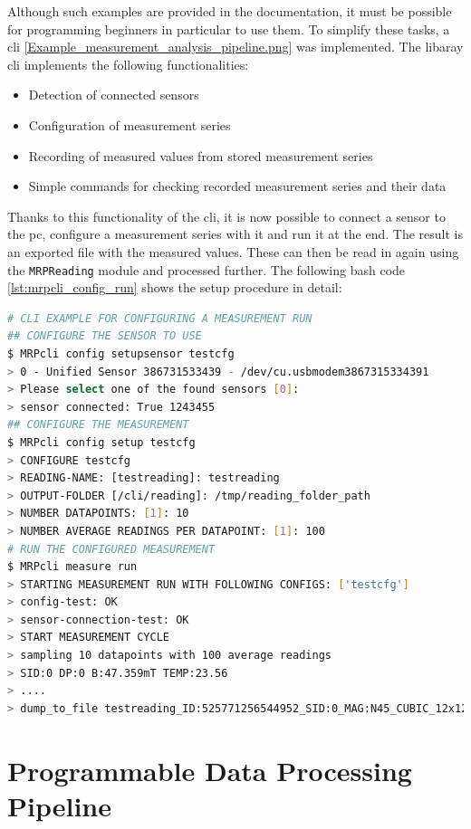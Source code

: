 Although such examples are provided in the documentation, it must be
possible for programming beginners in particular to use them. To
simplify these tasks, a \gls{cli}
\ref{Example_measurement_analysis_pipeline.png} was implemented. The
libaray \gls{cli} implements the following functionalities:

\begin{itemize}
\tightlist
\item
  Detection of connected sensors
\item
  Configuration of measurement series
\item
  Recording of measured values from stored measurement series
\item
  Simple commands for checking recorded measurement series and their
  data
\end{itemize}

Thanks to this functionality of the \gls{cli}, it is now possible to
connect a sensor to the \gls{pc}, configure a measurement series with it
and run it at the end. The result is an exported file with the measured
values. These can then be read in again using the
\passthrough{\lstinline!MRPReading!} module and processed further. The
following bash code \ref{lst:mrpcli_config_run} shows the setup
procedure in detail:

\begin{lstlisting}[language=bash, caption={CLI example for configuring a measurement run}, label=lst:mrpcli_config_run]
# CLI EXAMPLE FOR CONFIGURING A MEASUREMENT RUN
## CONFIGURE THE SENSOR TO USE
$ MRPcli config setupsensor testcfg
> 0 - Unified Sensor 386731533439 - /dev/cu.usbmodem3867315334391
> Please select one of the found sensors [0]:
> sensor connected: True 1243455
## CONFIGURE THE MEASUREMENT
$ MRPcli config setup testcfg
> CONFIGURE testcfg
> READING-NAME: [testreading]: testreading
> OUTPUT-FOLDER [/cli/reading]: /tmp/reading_folder_path
> NUMBER DATAPOINTS: [1]: 10
> NUMBER AVERAGE READINGS PER DATAPOINT: [1]: 100
# RUN THE CONFIGURED MEASUREMENT
$ MRPcli measure run
> STARTING MEASUREMENT RUN WITH FOLLOWING CONFIGS: ['testcfg']
> config-test: OK
> sensor-connection-test: OK
> START MEASUREMENT CYCLE
> sampling 10 datapoints with 100 average readings
> SID:0 DP:0 B:47.359mT TEMP:23.56
> ....
> dump_to_file testreading_ID:525771256544952_SID:0_MAG:N45_CUBIC_12x12x12.mag.json
\end{lstlisting}

\hypertarget{programmable-data-processing-pipeline}{%
\section{Programmable Data Processing
Pipeline}\label{programmable-data-processing-pipeline}}


